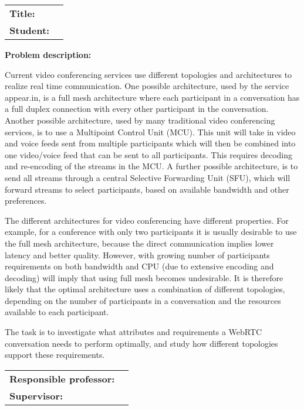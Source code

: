 \begin{titlingpage}

\noindent
\begin{tabular}{@{}p{4cm}l}
\textbf{Title:} 	& \thetitle \\
\textbf{Student:}	& \theauthor \\
\end{tabular}

\vspace{4ex}
\noindent\textbf{Problem description:}
\vspace{2ex}

Current video conferencing services use different topologies and architectures to realize real time communication. One possible architecture, used by the service appear.in, is a full mesh architecture where each participant in a conversation has a full duplex connection with every other participant in the conversation. Another possible architecture, used by many traditional video conferencing services, is to use a Multipoint Control Unit (MCU). This unit will take in video and voice feeds sent from multiple participants which will then be combined into one video/voice feed that can be sent to all participants. This requires decoding and re-encoding of the streams in the MCU. A further possible architecture, is to send all streams through a central Selective Forwarding Unit (SFU), which will forward streams to select participants, based on available bandwidth and other preferences.

The different architectures for video conferencing have different properties. For example, for a conference with only two participants it is usually desirable to use the full mesh architecture, because the direct communication implies lower latency and better quality. However, with growing number of participants requirements on both bandwidth and CPU (due to extensive encoding and decoding) will imply that using full mesh becomes undesirable.  It is therefore likely that the optimal architecture uses a combination of different topologies, depending on the number of participants in a conversation and the resources available to each participant.

The task is to investigate what attributes and requirements a WebRTC conversation needs to perform optimally, and study how different topologies support these requirements.

\vspace{6ex}

\noindent
\begin{tabular}{@{}p{4cm}l}
\textbf{Responsible professor:} 	& \theprofessor \\
\textbf{Supervisor:}			& \thesupervisor \\
\end{tabular}

\end{titlingpage}

